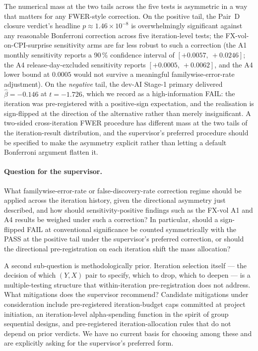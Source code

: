 The numerical mass at the two tails across the five tests is asymmetric
in a way that matters for any FWER-style correction. On the positive
tail, the Pair~D closure verdict's headline
\(p \approx 1.46 \times 10^{-8}\) is overwhelmingly significant against
any reasonable Bonferroni correction across five iteration-level tests;
the FX-vol-on-CPI-surprise sensitivity arms are far less robust to such
a correction (the A1 monthly sensitivity reports a 90\,\% confidence
interval of \([+0.0057,\ +0.0246]\); the A4 release-day-excluded
sensitivity reports \([+0.0005,\ +0.0062]\), and the A4 lower bound at
\(0.0005\) would not survive a meaningful familywise-error-rate
adjustment). On the \emph{negative} tail, the dev-AI Stage-1 primary
delivered \(\hat{\beta} = -0.146\) at \(t = -1.726\), which we record as
a high-information FAIL: the iteration was pre-registered with a
positive-sign expectation, and the realisation is sign-flipped at the
direction of the alternative rather than merely insignificant. A
two-sided cross-iteration FWER procedure has different mass at the two
tails of the iteration-result distribution, and the supervisor's
preferred procedure should be specified to make the asymmetry explicit
rather than letting a default Bonferroni argument flatten it.

\paragraph{Question for the supervisor.} What familywise-error-rate or
false-discovery-rate correction regime should be applied across the
iteration history, given the directional asymmetry just described, and
how should sensitivity-positive findings such as the FX-vol A1 and A4
results be weighed under such a correction? In particular, should a
sign-flipped FAIL at conventional significance be counted symmetrically
with the PASS at the positive tail under the supervisor's preferred
correction, or should the directional pre-registration on each iteration
shift the mass allocation?

A second sub-question is methodologically prior. Iteration selection
itself --- the decision of which \((Y, X)\) pair to specify, which to
drop, which to deepen --- is a multiple-testing structure that
within-iteration pre-registration does not address. What mitigations
does the supervisor recommend? Candidate mitigations under consideration
include pre-registered iteration-budget caps committed at project
initiation, an iteration-level alpha-spending function in the spirit of
group sequential designs, and pre-registered iteration-allocation rules
that do not depend on prior verdicts. We have no current basis for
choosing among these and are explicitly asking for the supervisor's
preferred form.

